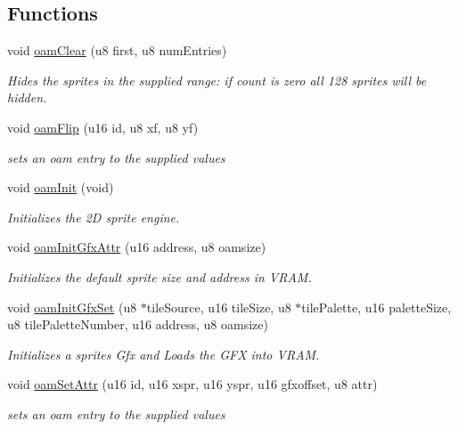 \subsection*{Functions}
\begin{DoxyCompactItemize}
\item 
void \hyperlink{a00365_a480021d319f990d930da8fc7fb11fce4}{oam\+Clear} (u8 first, u8 num\+Entries)
\begin{DoxyCompactList}\small\item\em Hides the sprites in the supplied range\+: if count is zero all 128 sprites will be hidden. \end{DoxyCompactList}\item 
void \hyperlink{a00365_af206f6568efabd13b1d65db1c2d4e24a}{oam\+Flip} (u16 id, u8 xf, u8 yf)
\begin{DoxyCompactList}\small\item\em sets an oam entry to the supplied values \end{DoxyCompactList}\item 
\mbox{\label{a00365_a274b5d953c60f5455937be288f6652ee}} 
void \hyperlink{a00365_a274b5d953c60f5455937be288f6652ee}{oam\+Init} (void)
\begin{DoxyCompactList}\small\item\em Initializes the 2D sprite engine. \end{DoxyCompactList}\item 
void \hyperlink{a00365_ad28cccee6dcd379989a0361fe868bddb}{oam\+Init\+Gfx\+Attr} (u16 address, u8 oamsize)
\begin{DoxyCompactList}\small\item\em Initializes the default sprite size and address in V\+R\+AM. \end{DoxyCompactList}\item 
void \hyperlink{a00365_a46e0be47f8fc865a7f43c1b0b126e59a}{oam\+Init\+Gfx\+Set} (u8 $\ast$tile\+Source, u16 tile\+Size, u8 $\ast$tile\+Palette, u16 palette\+Size, u8 tile\+Palette\+Number, u16 address, u8 oamsize)
\begin{DoxyCompactList}\small\item\em Initializes a sprites Gfx and Loads the G\+FX into V\+R\+AM. \end{DoxyCompactList}\item 
void \hyperlink{a00365_a9a76e12af57f5debf4df08c98820a2a5}{oam\+Set\+Attr} (u16 id, u16 xspr, u16 yspr, u16 gfxoffset, u8 attr)
\begin{DoxyCompactList}\small\item\em sets an oam entry to the supplied values \end{DoxyCompactList}\item 

\end{DoxyCompactItemize}
